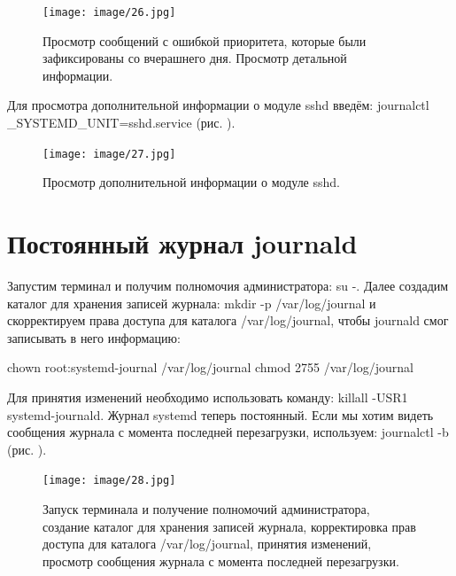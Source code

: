 \documentclass[
  english,
  russian,
  12pt,
  a4paper,
  DIV=11,
  numbers=noendperiod]{scrreprt}
\begin{document}
\begin{figure}

{\centering \texttt{[image: image/26.jpg]}

}

\caption{Просмотр сообщений с ошибкой приоритета, которые были
зафиксированы со вчерашнего дня. Просмотр детальной информации.}

\end{figure}%

Для просмотра дополнительной информации о модуле sshd введём: journalctl
\_SYSTEMD\_UNIT=sshd.service (рис. \autocite*{fig:027}).

\begin{figure}

{\centering \texttt{[image: image/27.jpg]}

}

\caption{Просмотр дополнительной информации о модуле sshd.}

\end{figure}%

\section{Постоянный журнал
journald}\label{ux43fux43eux441ux442ux43eux44fux43dux43dux44bux439-ux436ux443ux440ux43dux430ux43b-journald}

Запустим терминал и получим полномочия администратора: su -. Далее
создадим каталог для хранения записей журнала: mkdir -p /var/log/journal
и скорректируем права доступа для каталога /var/log/journal, чтобы
journald смог записывать в него информацию:

chown root:systemd-journal /var/log/journal chmod 2755 /var/log/journal

Для принятия изменений необходимо использовать команду: killall -USR1
systemd-journald. Журнал systemd теперь постоянный. Если мы хотим видеть
сообщения журнала с момента последней перезагрузки, используем:
journalctl -b (рис. \autocite*{fig:028}).

\begin{figure}

{\centering \texttt{[image: image/28.jpg]}

}

\caption{Запуск терминала и получение полномочий администратора,
создание каталог для хранения записей журнала, корректировка прав
доступа для каталога /var/log/journal, принятия изменений, просмотр
сообщения журнала с момента последней перезагрузки.}

\end{figure}%
\end{document}
